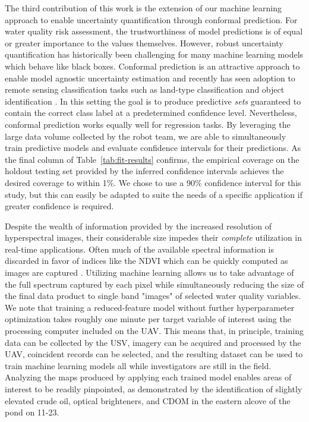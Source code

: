 \documentclass[remotesensing,article,submit,pdftex,moreauthors]{Definitions/mdpi}
\begin{document}
The third contribution of this work is the extension of our machine learning approach to enable uncertainty quantification through conformal prediction. For water quality risk assessment, the trustworthiness of model predictions is of equal or greater importance to the values themselves. However, robust uncertainty quantification has historically been challenging for many machine learning models which behave like black boxes.
Conformal prediction is an attractive approach to enable model agnostic uncertainty estimation and recently has seen adoption to remote sensing classification tasks such as land-type classification and object identification \cite{valle2023quantifying, zhu2024inductive}. In this setting the goal is to produce predictive \textit{sets} guaranteed to contain the correct class label at a predetermined confidence level. Nevertheless, conformal prediction works equally well for regression tasks. By leveraging the large data volume collected by the robot team, we are able to simultaneously train predictive models and evaluate confidence intervals for their predictions. As the final column of Table~\ref{tab:fit-results} confirms, the empirical coverage on the holdout testing set provided by the inferred confidence intervals achieves the desired coverage to within 1\%. We chose to use a 90\% confidence interval for this study, but this can easily be adapted to suite the needs of a specific application if greater confidence is required. 

Despite the wealth of information provided by the increased resolution of hyperspectral images, their considerable size impedes their \textit{complete} utilization in real-time applications. Often much of the available spectral information is discarded in favor of indices like the NDVI which can be quickly computed as images are captured \cite{horstrand2019uav}. Utilizing machine learning allows us to take advantage of the full spectrum captured by each pixel while simultaneously reducing the size of the final data product to single band "images" of selected water quality variables. We note that training a reduced-feature model without further hyperparameter optimization takes roughly one minute per target variable of interest using the processing computer included on the UAV. This means that, in principle, training data can be collected by the USV, imagery can be acquired and processed by the UAV, coincident records can be selected, and the resulting dataset can be used to train machine learning models all while investigators are still in the field. Analyzing the maps produced by applying each trained model enables areas of interest to be readily pinpointed, as demonstrated by the identification of slightly elevated crude oil, optical brighteners, and CDOM in the eastern alcove of the pond on 11-23. 
\end{document}
